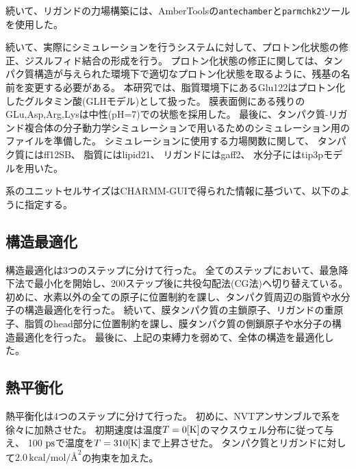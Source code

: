 続いて、リガンドの力場構築には、AmberToolsの\texttt{antechamber}と\texttt{parmchk2}ツールを使用した。

続いて、実際にシミュレーションを行うシステムに対して、プロトン化状態の修正、ジスルフィド結合の形成を行う。
プロトン化状態の修正に関しては、タンパク質構造が与えられた環境下で適切なプロトン化状態を取るように、残基の名前を変更する必要がある。
本研究では、脂質環境下にあるGlu122はプロトン化したグルタミン酸(GLHモデル)として扱った。
膜表面側にある残りのGLu,Asp,Arg,Lysは中性(pH=7)での状態を採用した。
最後に、タンパク質-リガンド複合体の分子動力学シミュレーションで用いるためのシミュレーション用のファイルを準備した。
シミュレーションに使用する力場関数に関して、
タンパク質にはff12SB、
脂質にはlipid21、
リガンドにはgaff2、
水分子にはtip3pモデルを用いた。

系のユニットセルサイズはCHARMM-GUIで得られた情報に基づいて、以下のように指定する。
\begin{table}[!ht]
  \centering
  \caption{シミュレーションに用いた系の大きさ}
  \label{tab:system_size}
\end{table}


\subsection{構造最適化}
構造最適化は3つのステップに分けて行った。
全てのステップにおいて、最急降下法で最小化を開始し、200ステップ後に共役勾配法(CG法)へ切り替えている。
初めに、水素以外の全ての原子に位置制約を課し、タンパク質周辺の脂質や水分子の構造最適化を行った。
続いて、膜タンパク質の主鎖原子、リガンドの重原子、脂質のhead部分に位置制約を課し、膜タンパク質の側鎖原子や水分子の構造最適化を行った。
最後に、上記の束縛力を弱めて、全体の構造を最適化した。

\subsection{熱平衡化}
熱平衡化は4つのステップに分けて行った。
初めに、NVTアンサンブルで系を徐々に加熱させた。
初期速度は温度$T = 0 \rm{[K]}$のマクスウェル分布に従って与え、 
100 $\rm{ps}$で温度を$T = 310 \rm{[K]}$まで上昇させた。
タンパク質とリガンドに対して$2.0 \, \text{kcal/mol/\AA}^2$の拘束を加えた。

